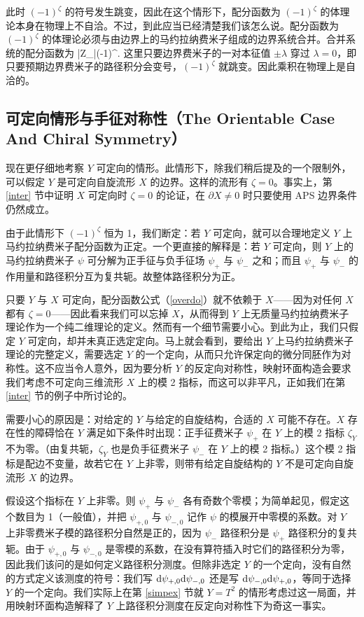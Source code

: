 此时 $(-1)^\zeta$ 的符号发生跳变，因此在这个情形下，配分函数为 $(-1)^\zeta$ 的体理论本身在物理上不自洽。不过，到此应当已经清楚我们该怎么说。配分函数为 $(-1)^\zeta$ 的体理论必须与由边界上的马约拉纳费米子组成的边界系统合并。合并系统的配分函数为
\be\label{overdo}|Z_\psi|(-1)^\zeta.\ee
这里只要边界费米子的一对本征值 $\pm \lambda$ 穿过 $\lambda=0$，即只要预期边界费米子的路径积分会变号，$(-1)^\zeta$ 就跳变。因此乘积在物理上是自洽的。

\subsection{可定向情形与手征对称性（The Orientable Case And Chiral Symmetry）}\label{orch}

现在更仔细地考察 $Y$ 可定向的情形。此情形下，除我们稍后提及的一个限制外，可以假定 $Y$ 是可定向自旋流形 $X$ 的边界。这样的流形有 $\zeta=0$。事实上，第 \ref{inter} 节中证明 $X$ 可定向时 $\zeta=0$ 的论证，在 $\partial X\not=0$ 时只要使用 APS 边界条件仍然成立。

由于此情形下 $(-1)^\zeta$ 恒为 1，我们断定：若 $Y$ 可定向，就可以合理地定义 $Y$ 上马约拉纳费米子配分函数为正定。一个更直接的解释是：若 $Y$ 可定向，则 $Y$ 上的马约拉纳费米子 $\psi$ 可分解为正手征与负手征场 $\psi_+$ 与 $\psi_-$ 之和；而且 $\psi_+$ 与 $\psi_-$ 的作用量和路径积分互为复共轭。故整体路径积分为正。

只要 $Y$ 与 $X$ 可定向，配分函数公式（\ref{overdo}）就不依赖于 $X$------因为对任何 $X$ 都有 $\zeta=0$------因此看来我们可以忘掉 $X$，从而得到 $Y$ 上无质量马约拉纳费米子理论作为一个纯二维理论的定义。然而有一个细节需要小心。到此为止，我们只假定 $Y$ 可定向，却并未真正选定定向。马上就会看到，要给出 $Y$ 上马约拉纳费米子理论的完整定义，需要选定 $Y$ 的一个定向，从而只允许保定向的微分同胚作为对称性。这不应当令人意外，因为要分析 $Y$ 的反定向对称性，映射环面构造会要求我们考虑不可定向三维流形 $X$ 上的模 2 指标，而这可以非平凡，正如我们在第 \ref{inter} 节的例子中所讨论的。

需要小心的原因是：对给定的 $Y$ 与给定的自旋结构，合适的 $X$ 可能不存在。$X$ 存在性的障碍恰在 $Y$ 满足如下条件时出现：正手征费米子 $\psi_+$ 在 $Y$ 上的模 2 指标 $\zeta_Y$ 不为零。（由复共轭，$\zeta_Y$ 也是负手征费米子 $\psi_-$ 在 $Y$ 上的模 2 指标。）这个模 2 指标是配边不变量，故若它在 $Y$ 上非零，则带有给定自旋结构的 $Y$ 不是可定向自旋流形 $X$ 的边界。

假设这个指标在 $Y$ 上非零。则 $\psi_+$ 与 $\psi_-$ 各有奇数个零模；为简单起见，假定这个数目为 1（一般值），并把 $\psi_{+,0}$ 与 $\psi_{-,0}$ 记作 $\psi$ 的模展开中零模的系数。对 $Y$ 上非零费米子模的路径积分自然是正的，因为 $\psi_-$ 路径积分是 $\psi_+$ 路径积分的复共轭。由于 $\psi_{+,0}$ 与 $\psi_{-,0}$ 是零模的系数，在没有算符插入时它们的路径积分为零，因此我们该问的是如何定义路径积分测度。但除非选定 $Y$ 的一个定向，没有自然的方式定义该测度的符号：我们写 ${\mathrm d}\psi_{+,0}{\mathrm d}\psi_{-,0}$ 还是写 ${\mathrm d}\psi_{-,0}{\mathrm d}\psi_{+,0}$，等同于选择 $Y$ 的一个定向。我们实际上在第 \ref{simpex} 节就 $Y=T^2$ 的情形考虑过这一局面，并用映射环面构造解释了 $Y$ 上路径积分测度在反定向对称性下为奇这一事实。

